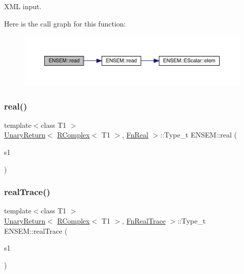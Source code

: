 X\+ML input. 

Here is the call graph for this function\+:\nopagebreak
\begin{figure}[H]
\begin{center}
\leavevmode
\includegraphics[width=350pt]{da/dc7/group__rcomplex_ga4e957daaafbfd0e1b97883627dddd8f7_cgraph}
\end{center}
\end{figure}
\mbox{\label{group__rcomplex_gac6f6a1d512bae897437df14ec96570a7}} 
\subsubsection{\texorpdfstring{real()}{real()}}
{\footnotesize\ttfamily template$<$class T1 $>$ \\
\mbox{\hyperlink{structENSEM_1_1UnaryReturn}{Unary\+Return}}$<$ \mbox{\hyperlink{classENSEM_1_1RComplex}{R\+Complex}}$<$ T1 $>$, \mbox{\hyperlink{structENSEM_1_1FnReal}{Fn\+Real}} $>$\+::Type\+\_\+t E\+N\+S\+E\+M\+::real (\begin{DoxyParamCaption}\item[{const \mbox{\hyperlink{classENSEM_1_1RComplex}{R\+Complex}}$<$ T1 $>$ \&}]{s1 }\end{DoxyParamCaption})\hspace{0.3cm}{\ttfamily [inline]}}

\mbox{\label{group__rcomplex_ga27bda5008ac5b345ddf3273c5949d00c}} 
\subsubsection{\texorpdfstring{realTrace()}{realTrace()}}
{\footnotesize\ttfamily template$<$class T1 $>$ \\
\mbox{\hyperlink{structENSEM_1_1UnaryReturn}{Unary\+Return}}$<$ \mbox{\hyperlink{classENSEM_1_1RComplex}{R\+Complex}}$<$ T1 $>$, \mbox{\hyperlink{structENSEM_1_1FnRealTrace}{Fn\+Real\+Trace}} $>$\+::Type\+\_\+t E\+N\+S\+E\+M\+::real\+Trace (\begin{DoxyParamCaption}\item[{const \mbox{\hyperlink{classENSEM_1_1RComplex}{R\+Complex}}$<$ T1 $>$ \&}]{s1 }\end{DoxyParamCaption})\hspace{0.3cm}{\ttfamily [inline]}}

